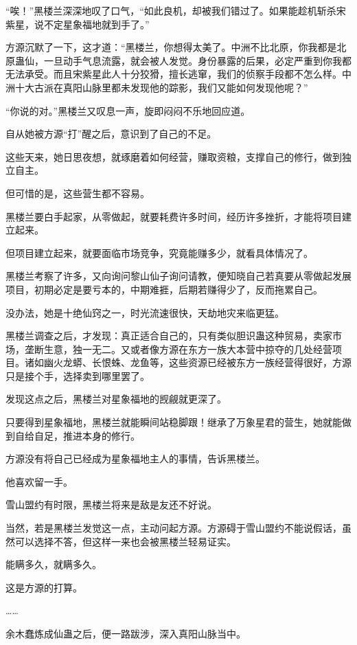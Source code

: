 \begin{this_body}
“唉！”黑楼兰深深地叹了口气，“如此良机，却被我们错过了。如果能趁机斩杀宋紫星，说不定星象福地就到手了。”

方源沉默了一下，这才道：“黑楼兰，你想得太美了。中洲不比北原，你我都是北原蛊仙，一旦动手气息流露，就会被人发觉。身份暴露的后果，必定严重到你我都无法承受。而且宋紫星此人十分狡猾，擅长逃窜，我们的侦察手段都不怎么样。中洲十大古派在真阳山脉里都未发现他的踪影，我们又能如何发现他呢？”

“你说的对。”黑楼兰又叹息一声，旋即闷闷不乐地回应道。

自从她被方源“打”醒之后，意识到了自己的不足。

这些天来，她日思夜想，就琢磨着如何经营，赚取资粮，支撑自己的修行，做到独立自主。

但可惜的是，这些营生都不容易。

黑楼兰要白手起家，从零做起，就要耗费许多时间，经历许多挫折，才能将项目建立起来。

但项目建立起来，就要面临市场竞争，究竟能赚多少，就看具体情况了。

黑楼兰考察了许多，又向询问黎山仙子询问请教，便知晓自己若真要从零做起发展项目，初期必定是要亏本的，中期难捱，后期若赚得少了，反而拖累自己。

没办法，她是十绝仙窍之一，时光流速很快，天劫地灾来临更猛。

黑楼兰调查之后，才发现：真正适合自己的，只有类似胆识蛊这种贸易，卖家市场，垄断生意，独一无二。又或者像方源在东方一族大本营中掠夺的几处经营项目。诸如幽火龙蟒、长恨蛛、龙鱼等，这些资源已经被东方一族经营得很好，方源只是接个手，选择卖到哪里罢了。

发现这点之后，黑楼兰对星象福地的觊觎就更深了。

只要得到星象福地，黑楼兰就能瞬间站稳脚跟！继承了万象星君的营生，她就能做到自给自足，推进本身的修行。

方源没有将自己已经成为星象福地主人的事情，告诉黑楼兰。

他喜欢留一手。

雪山盟约有时限，黑楼兰将来是敌是友还不好说。

当然，若是黑楼兰发觉这一点，主动问起方源。方源碍于雪山盟约不能说假话，虽然可以选择不答，但这样一来也会被黑楼兰轻易证实。

能瞒多久，就瞒多久。

这是方源的打算。

……

余木蠢炼成仙蛊之后，便一路跋涉，深入真阳山脉当中。


\end{this_body}
